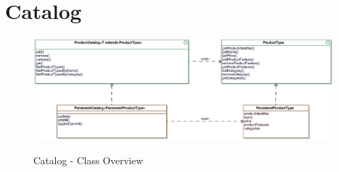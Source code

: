 \section{Catalog}

\begin{figure}[ht]
	\centering
  \includegraphics[scale =.74]{images/Catalog_Overview.eps}
	\label{catalog_overview}
	\caption{Catalog - Class Overview}
\end{figure}
